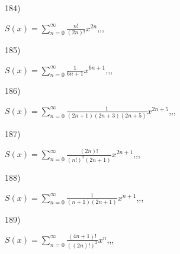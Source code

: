\documentclass[11pt, ukrainian]{article}
\begin{document}
\par
\vspace{0.9cm}
184) \space 
{%
{$S(x)=\sum\limits_{n=0}^{\infty}{\frac{n!}{(2n)!}}{x^{{2n}}}$},,, \par \smallskip  
}
\par
\vspace{0.9cm}
185) \space 
{%
{$S(x)=\sum\limits_{n=0}^{\infty}{\frac{1}{6n+1}}{x^{{6n+1}}}$},,, \par \smallskip  
}
\par
\vspace{0.9cm}
186) \space 
{%
{$S(x)=\sum\limits_{n=0}^{\infty}{\frac{1}{(2n+1)(2n+3)(2n+5)}}{x^{{2n+5}}}$},,, \par \smallskip  
}
\par
\vspace{0.9cm}
187) \space 
{%
{$S(x)=\sum\limits_{n=0}^{\infty}{\frac{(2n)!}{(n!)^2(2n+1)}}{x^{{2n+1}}}$},,, \par \smallskip  
}
\par
\vspace{0.9cm}
188) \space 
{%
{$S(x)=\sum\limits_{n=0}^{\infty}{\frac{1}{(n+1)(2n+1)}}{x^{{n+1}}}$},,, \par \smallskip  
}
\par
\vspace{0.9cm}
189) \space 
{%
{$S(x)=\sum\limits_{n=0}^{\infty}{\frac{(4n+1)!}{((2n)!)^2}}{x^{{n}}}$},,, \par \smallskip  
}
\end{document}
